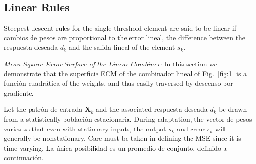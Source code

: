 \documentclass[10pt,twocolumn]{article}
\newcommand{\X}{\bm{X}}
\begin{document}
\subsection{Linear Rules}
Steepest-descent rules for the single threshold element are said to be linear if
cambios de pesos are proportional to the error lineal, the difference between the
respuesta deseada $d_k$ and the salida lineal of the element $s_k$.

\textit{Mean-Square Error Surface of the Linear Combiner:} In this section we
demonstrate that the superficie ECM of the combinador lineal of Fig.~\ref{fig:1} is a
función cuadrática of the weights, and thus easily traversed by descenso por gradiente.

Let the patrón de entrada $\X_k$ and the associated respuesta deseada $d_k$ be drawn
from a statistically población estacionaria. During adaptation, the vector de pesos
varies so that even with stationary inputs, the output $s_k$ and error $\epsilon_k$
will generally be nonstationary. Care must be taken in defining the MSE since it is
time-varying. La única posibilidad es un promedio de conjunto, definido a continuación.
\end{document}
